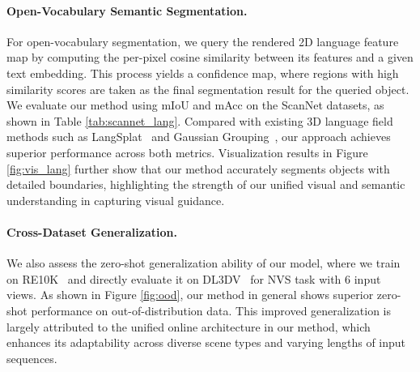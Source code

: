 \paragraph{Open-Vocabulary Semantic Segmentation.} For open-vocabulary segmentation, we query the rendered 2D language feature map by computing the per-pixel cosine similarity between its features and a given text embedding. This process yields a confidence map, where regions with high similarity scores are taken as the final segmentation result for the queried object. We evaluate our method using mIoU and mAcc on the ScanNet datasets, as shown in Table \ref{tab:scannet_lang}. Compared with existing 3D language field methods such as LangSplat~\cite{qin2024langsplat} and Gaussian Grouping~\cite{ye2024gaussian}, our approach achieves superior performance across both metrics. Visualization results in Figure \ref{fig:vis_lang} further show that our method accurately segments objects with detailed boundaries, highlighting the strength of our unified visual and semantic understanding in capturing visual guidance. 



\paragraph{Cross-Dataset Generalization.} We also assess the zero-shot generalization ability of our model, where we train on RE10K~\cite{zhou2018stereo} and directly evaluate it on DL3DV~\cite{ling2024dl3dv} for NVS task with 6 input views. As shown in Figure \ref{fig:ood}, our method in general shows superior zero-shot performance on out-of-distribution data. This improved generalization is largely attributed to the unified online architecture in our method, which enhances its adaptability across diverse scene types and varying lengths of input sequences.


